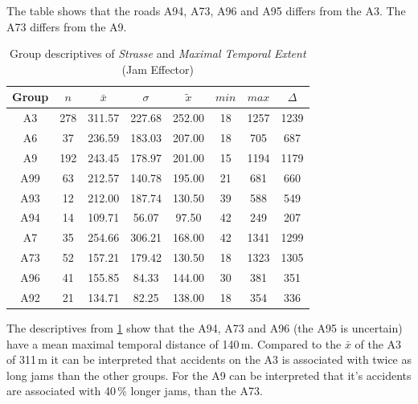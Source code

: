The table shows that the roads A94, A73, A96 and A95 differs from the A3. The A73 differs from the A9.
\begin{table}[ht]
	\tiny
	\centering
	\begin{tabular}{c|c|c|c|c|c|c|c}
		\toprule
		Group & $n$ & $\bar{x}$ & $\sigma$ & $\tilde{x}$ & $min$ & $max$ & $\Delta$ \\
		\midrule
		A3   & 278 & 311.57 & 227.68 & 252.00 & 18 & 1257 & 1239 \\ 
		A6   & 37  & 236.59 & 183.03 & 207.00 & 18 & 705  & 687  \\ 
		A9   & 192 & 243.45 & 178.97 & 201.00 & 15 & 1194 & 1179 \\ 
		A99  & 63  & 212.57 & 140.78 & 195.00 & 21 & 681  & 660  \\ 
		A93  & 12  & 212.00 & 187.74 & 130.50 & 39 & 588  & 549  \\ 
		A94  & 14  & 109.71 & 56.07  & 97.50  & 42 & 249  & 207  \\ 
		A7   & 35  & 254.66 & 306.21 & 168.00 & 42 & 1341 & 1299 \\ 
		A73  & 52  & 157.21 & 179.42 & 130.50 & 18 & 1323 & 1305 \\ 
		A96  & 41  & 155.85 & 84.33  & 144.00 & 30 & 381  & 351  \\ 
		A92  & 21  & 134.71 & 82.25  & 138.00 & 18 & 354  & 336 \\ 
		\bottomrule
	  \end{tabular}
    \caption{Group descriptives of \textit{Strasse} and \textit{Maximal Temporal Extent} (Jam Effector)}
    \label{tbl:descriptives_baysis_effector_Strasse_TMax}
\end{table}
The descriptives from \cref{tbl:descriptives_baysis_effector_Strasse_TMax} show that the A94, A73 and A96 (the A95 is uncertain) have a mean maximal temporal distance of 140\,m. Compared to the $\bar{x}$ of the A3 of 311\,m it can be interpreted that accidents on the A3 is associated with twice as long jams than the other groups. For the A9 can be interpreted that it's accidents are associated with 40\,\% longer jams, than the A73.

